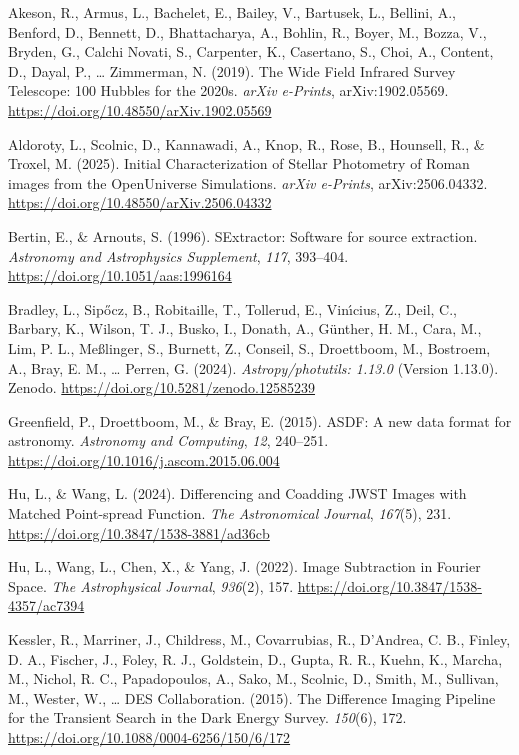 \documentclass[10pt,a4paper,onecolumn]{article}
\newlength{\cslhangindent}
\newenvironment{CSLReferences}[2] %
 {\begin{list}{}{%
  \setlength{\itemindent}{0pt}
  \setlength{\leftmargin}{0pt}
  \setlength{\parsep}{0pt}
  \ifodd #1
   \setlength{\leftmargin}{\cslhangindent}
   \setlength{\itemindent}{-1\cslhangindent}
  \fi
  \setlength{\itemsep}{#2\baselineskip}}}
 {\end{list}}
\begin{document}
\label{refs}
\begin{CSLReferences}{1}{0.5}
Akeson, R., Armus, L., Bachelet, E., Bailey, V., Bartusek, L., Bellini,
A., Benford, D., Bennett, D., Bhattacharya, A., Bohlin, R., Boyer, M.,
Bozza, V., Bryden, G., Calchi Novati, S., Carpenter, K., Casertano, S.,
Choi, A., Content, D., Dayal, P., \ldots{} Zimmerman, N. (2019). {The
Wide Field Infrared Survey Telescope: 100 Hubbles for the 2020s}.
\emph{arXiv e-Prints}, arXiv:1902.05569.
\url{https://doi.org/10.48550/arXiv.1902.05569}

Aldoroty, L., Scolnic, D., Kannawadi, A., Knop, R., Rose, B., Hounsell,
R., \& Troxel, M. (2025). {Initial Characterization of Stellar
Photometry of Roman images from the OpenUniverse Simulations}.
\emph{arXiv e-Prints}, arXiv:2506.04332.
\url{https://doi.org/10.48550/arXiv.2506.04332}

Bertin, E., \& Arnouts, S. (1996). {SExtractor: Software for source
extraction.} \emph{Astronomy and Astrophysics Supplement}, \emph{117},
393--404. \url{https://doi.org/10.1051/aas:1996164}

Bradley, L., Sipőcz, B., Robitaille, T., Tollerud, E., Vinı́cius, Z.,
Deil, C., Barbary, K., Wilson, T. J., Busko, I., Donath, A., Günther, H.
M., Cara, M., Lim, P. L., Meßlinger, S., Burnett, Z., Conseil, S.,
Droettboom, M., Bostroem, A., Bray, E. M., \ldots{} Perren, G. (2024).
\emph{Astropy/photutils: 1.13.0} (Version 1.13.0). Zenodo.
\url{https://doi.org/10.5281/zenodo.12585239}

Greenfield, P., Droettboom, M., \& Bray, E. (2015). {ASDF: A new data
format for astronomy}. \emph{Astronomy and Computing}, \emph{12},
240--251. \url{https://doi.org/10.1016/j.ascom.2015.06.004}

Hu, L., \& Wang, L. (2024). {Differencing and Coadding JWST Images with
Matched Point-spread Function}. \emph{The Astronomical Journal},
\emph{167}(5), 231. \url{https://doi.org/10.3847/1538-3881/ad36cb}

Hu, L., Wang, L., Chen, X., \& Yang, J. (2022). {Image Subtraction in
Fourier Space}. \emph{The Astrophysical Journal}, \emph{936}(2), 157.
\url{https://doi.org/10.3847/1538-4357/ac7394}

Kessler, R., Marriner, J., Childress, M., Covarrubias, R., D'Andrea, C.
B., Finley, D. A., Fischer, J., Foley, R. J., Goldstein, D., Gupta, R.
R., Kuehn, K., Marcha, M., Nichol, R. C., Papadopoulos, A., Sako, M.,
Scolnic, D., Smith, M., Sullivan, M., Wester, W., \ldots{} DES
Collaboration. (2015). {The Difference Imaging Pipeline for the
Transient Search in the Dark Energy Survey}. \emph{150}(6), 172.
\url{https://doi.org/10.1088/0004-6256/150/6/172}


\end{CSLReferences}
\end{document}
